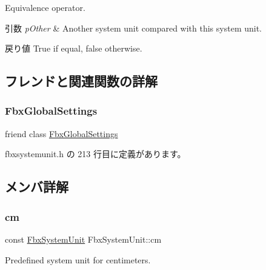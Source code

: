 Equivalence operator. 
\begin{DoxyParams}{引数}
{\em p\+Other} & Another system unit compared with this system unit. \\
\hline
\end{DoxyParams}
\begin{DoxyReturn}{戻り値}
{\ttfamily True} if equal, {\ttfamily false} otherwise. 
\end{DoxyReturn}


\subsection{フレンドと関連関数の詳解}
\mbox{\label{class_fbx_system_unit_ac6f6b3953bf13718eb87110d614b3c9a}} 
\subsubsection{\texorpdfstring{Fbx\+Global\+Settings}{FbxGlobalSettings}}
{\footnotesize\ttfamily friend class \hyperlink{class_fbx_global_settings}{Fbx\+Global\+Settings}\hspace{0.3cm}{\ttfamily [friend]}}



 fbxsystemunit.\+h の 213 行目に定義があります。



\subsection{メンバ詳解}
\mbox{\label{class_fbx_system_unit_a2938b6feaf5711daea463071e89d073e}} 
\subsubsection{\texorpdfstring{cm}{cm}}
{\footnotesize\ttfamily const \hyperlink{class_fbx_system_unit}{Fbx\+System\+Unit} Fbx\+System\+Unit\+::cm\hspace{0.3cm}{\ttfamily [static]}}



Predefined system unit for centimeters. 



